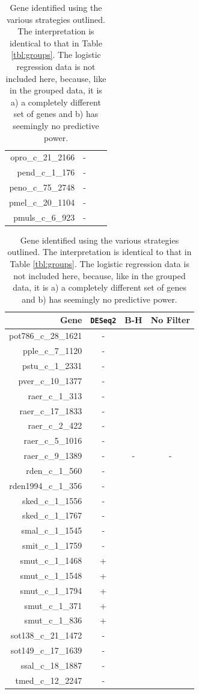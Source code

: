 \documentclass{article}
\begin{document}
\begin{table}[h]
\begin{center}
\begin{tabular}{r|ccc}
opro\_c\_21\_2166 & - &  &   \\
  pend\_c\_1\_176 & - &  &   \\
peno\_c\_75\_2748 & - &  &   \\
pmel\_c\_20\_1104 & - &  &   \\
 pmuls\_c\_6\_923 & - &  &   
     \end{tabular}
  \begin{tabular}{r|ccc}
Gene &  \texttt{DESeq2} &   B-H & No Filter\\
\hline
 pot786\_c\_28\_1621 & - &  &   \\
 pple\_c\_7\_1120 & - &  &   \\
 pstu\_c\_1\_2331 & - &  &   \\
pver\_c\_10\_1377 & - &  &   \\
  raer\_c\_1\_313 & - &  &   \\
raer\_c\_17\_1833 & - &  &   \\
  raer\_c\_2\_422 & - &  &   \\
 raer\_c\_5\_1016 & - &  &   \\
 raer\_c\_9\_1389 & - &  - & -  \\
  rden\_c\_1\_560 & - &  &   \\
    rden1994\_c\_1\_356 & - &  &   \\
    sked\_c\_1\_1556 & - &  &   \\
    sked\_c\_1\_1767 & -  &  &   \\
smal\_c\_1\_1545 & -  &  &   \\
smit\_c\_1\_1759 & -  &  &   \\
smut\_c\_1\_1468 & +  &  &   \\
smut\_c\_1\_1548 & +  &  &   \\
smut\_c\_1\_1794 & + &  &   \\
smut\_c\_1\_371 & +  &  &   \\
smut\_c\_1\_836 & +  &  &   \\
  sot138\_c\_21\_1472 & - &  &   \\
  sot149\_c\_17\_1639 & - &  &   \\
    ssal\_c\_18\_1887 & - &  &   \\
    tmed\_c\_12\_2247 & - &  &   \\
\end{tabular}
\caption{\label{tbl:genes}Gene identified using the various strategies outlined. The interpretation is identical
to that in Table \ref{tbl:groups}. The logistic regression data is not included here, because, like in the grouped data,
it is a) a completely different set of genes and b) has seemingly no predictive power.}
\end{center}
\end{table}






\end{document}
